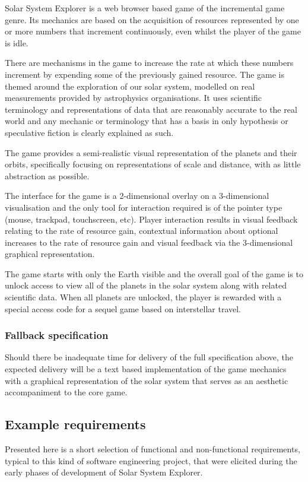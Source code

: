 \documentclass[twoside]{bhamthesis}
\begin{document}
Solar System Explorer is a web browser based game of the incremental game genre. Its mechanics are based on the acquisition of resources represented by one or more numbers that increment continuously, even whilst the player of the game is idle.

There are mechanisms in the game to increase the rate at which these numbers increment by expending some of the previously gained resource. The game is themed around the exploration of our solar system, modelled on real measurements provided by astrophysics organisations. It uses scientific terminology and representations of data that are reasonably accurate to the real world and any mechanic or terminology that has a basis in only hypothesis or speculative fiction is clearly explained as such.

The game provides a semi-realistic visual representation of the planets and their orbits, specifically focusing on representations of scale and distance, with as little abstraction as possible.

The interface for the game is a 2-dimensional overlay on a 3-dimensional visualisation and the only tool for interaction required is of the pointer type (mouse, trackpad, touchscreen, etc). Player interaction results in visual feedback relating to the rate of resource gain, contextual information about optional increases to the rate of resource gain and visual feedback via the 3-dimensional graphical representation.

The game starts with only the Earth visible and the overall goal of the game is to unlock access to view all of the planets in the solar system along with related scientific data. When all planets are unlocked, the player is rewarded with a special access code for a sequel game based on interstellar travel.

\subsubsection{Fallback specification}
Should there be inadequate time for delivery of the full specification above, the expected delivery will be a text based implementation of the game mechanics with a graphical representation of the solar system that serves as an aesthetic accompaniment to the core game.

\subsection{Example requirements}
Presented here is a short selection of functional and non-functional requirements, typical to this kind of software engineering project, that were elicited during the early phases of development of Solar System Explorer.
\end{document}

